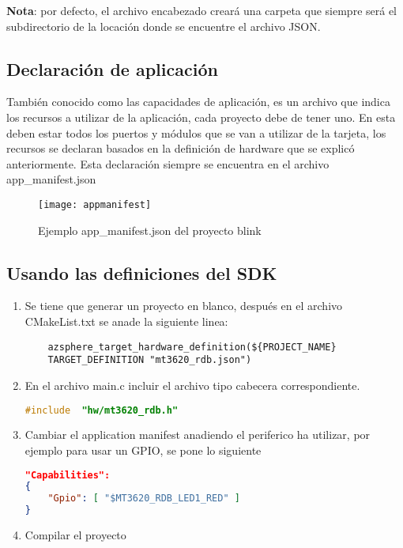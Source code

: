 \textbf{Nota}: por defecto, el archivo encabezado creará una carpeta que siempre será el subdirectorio de la locación donde se encuentre el archivo JSON.
\subsection{Declaración de aplicación}
También conocido como las capacidades de aplicación, es un archivo que indica los recursos a utilizar de la aplicación, cada proyecto debe de tener uno. En esta deben estar todos los puertos y módulos que se van a utilizar de la tarjeta, los recursos se declaran basados en la definición de hardware que se explicó anteriormente. Esta declaración siempre se encuentra en el archivo app\_manifest.json
\begin{figure}[h]
	\centering
	\texttt{[image: appmanifest]}
	\caption{Ejemplo app\_manifest.json del proyecto blink}
\end{figure}
\subsection{Usando las definiciones del SDK}

\begin{enumerate}
	\item Se tiene que generar un proyecto en blanco, después en el archivo CMakeList.txt se anade la siguiente linea:
	\begin{verbatim}
	azsphere_target_hardware_definition(${PROJECT_NAME} 
	TARGET_DEFINITION "mt3620_rdb.json") 
	\end{verbatim}
	\item 
	En el archivo main.c incluir el archivo tipo cabecera correspondiente.
	\begin{lstlisting}[language = C, firstnumber=0]
#include  "hw/mt3620_rdb.h"
	\end{lstlisting}
	\item 
	Cambiar el application manifest anadiendo el periferico ha utilizar, por ejemplo para usar un GPIO, se pone lo siguiente
	\begin{lstlisting}[language = json, firstnumber=0]
"Capabilities": 
{  
	"Gpio": [ "$MT3620_RDB_LED1_RED" ] 
}
	\end{lstlisting}
	\item 
	Compilar el proyecto
\end{enumerate}

